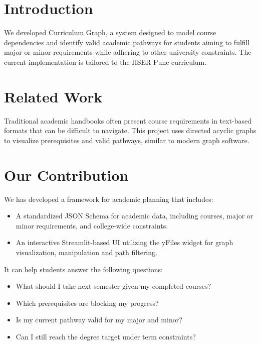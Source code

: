 \section{Introduction}

We developed Curriculum Graph, a system designed to model course dependencies and identify valid academic pathways 
for students aiming to fulfill major or minor requirements 
while adhering to other university constraints. 
The current implementation is tailored to the IISER Pune curriculum.

\section{Related Work}

Traditional academic handbooks often present course requirements in text-based formats that can be difficult to navigate. This project uses directed acyclic graphs to visualize prerequisites and valid pathways, similar to modern graph software.

\section{Our Contribution}

We has developed a framework for academic planning that includes:

\begin{itemize}
    \item A standardized JSON Schema for academic data, including courses, major or minor requirements, and college-wide constraints.
    \item An interactive Streamlit-based UI \citep{streamlit} utilizing the yFiles widget \citep{yfiles_streamlit} for graph visualization, manipulation and path filtering.
\end{itemize}

It can help students answer the following questions:

\begin{itemize}
    \item What should I take next semester given my completed courses?
    \item Which prerequisites are blocking my progress?
    \item Is my current pathway valid for my major and minor?
    \item Can I still reach the degree target under term constraints?
\end{itemize}

